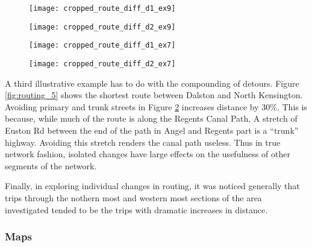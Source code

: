 \begin{figure}
\centering
\begin{minipage}{.5\textwidth}
  \centering
  \texttt{[image: cropped\_route\_diff\_d1\_ex9]}
  \label{fig:routing_3}
\end{minipage}%
\begin{minipage}{.5\textwidth}
  \centering
  \texttt{[image: cropped\_route\_diff\_d2\_ex9]}
  \label{fig:routing_4}
\end{minipage}
\end{figure}

\begin{figure}
\centering
\begin{minipage}{.5\textwidth}
  \centering
  \texttt{[image: cropped\_route\_diff\_d1\_ex7]}
  \label{fig:routing_5}
\end{minipage}%
\begin{minipage}{.5\textwidth}
  \centering
  \texttt{[image: cropped\_route\_diff\_d2\_ex7]}
  \label{fig:routing_6}
\end{minipage}
\end{figure}

A third illustrative example has to do with the compounding of detours. Figure \ref{fig:routing_5} shows the shortest route between Dalston and North Kensington. Avoiding primary and trunk streets in Figure \ref{fig:routing_6} increases distance by 30\%. This is because, while much of the route is along the Regents Canal Path, A stretch of Euston Rd between the end of the path in Angel and Regents part is a ``trunk'' highway. Avoiding this stretch renders the canal path useless. Thus in true network fashion, isolated changes have large effects on the usefulness of other segments of the network. 

Finally, in exploring individual changes in routing, it was noticed generally that trips through the nothern most and western most sections of the area investigated tended to be the trips with dramatic increases in distance. 

\subsubsection{Maps}

